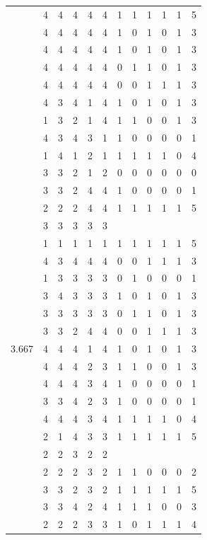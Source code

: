 \documentclass[]{msu-thesis}
\theoremstyle{definition}
\theoremstyle{definition}
\theoremstyle{definition}
\theoremstyle{remark}
\begin{document}
\begin{table}
{\begin{tabular}[t]{rrrrrrrrrrrr}
 & 4 & 4 & 4 & 4 & 4 & 1 & 1 & 1 & 1 & 1 & 5\\
 & 4 & 4 & 4 & 4 & 4 & 1 & 0 & 1 & 0 & 1 & 3\\
 & 4 & 4 & 4 & 4 & 4 & 1 & 0 & 1 & 0 & 1 & 3\\
 & 4 & 4 & 4 & 4 & 4 & 0 & 1 & 1 & 0 & 1 & 3\\
 & 4 & 4 & 4 & 4 & 4 & 0 & 0 & 1 & 1 & 1 & 3\\
 & 4 & 3 & 4 & 1 & 4 & 1 & 0 & 1 & 0 & 1 & 3\\
 & 1 & 3 & 2 & 1 & 4 & 1 & 1 & 0 & 0 & 1 & 3\\
 & 4 & 3 & 4 & 3 & 1 & 1 & 0 & 0 & 0 & 0 & 1\\
 & 1 & 4 & 1 & 2 & 1 & 1 & 1 & 1 & 1 & 0 & 4\\
 & 3 & 3 & 2 & 1 & 2 & 0 & 0 & 0 & 0 & 0 & 0\\
 & 3 & 3 & 2 & 4 & 4 & 1 & 0 & 0 & 0 & 0 & 1\\
 & 2 & 2 & 2 & 4 & 4 & 1 & 1 & 1 & 1 & 1 & 5\\
 & 3 & 3 & 3 & 3 & 3 &  &  &  &  &  & \\
 & 1 & 1 & 1 & 1 & 1 & 1 & 1 & 1 & 1 & 1 & 5\\
 & 4 & 3 & 4 & 4 & 4 & 0 & 0 & 1 & 1 & 1 & 3\\
 & 1 & 3 & 3 & 3 & 3 & 0 & 1 & 0 & 0 & 0 & 1\\
 & 3 & 4 & 3 & 3 & 3 & 1 & 0 & 1 & 0 & 1 & 3\\
 & 3 & 3 & 3 & 3 & 3 & 0 & 1 & 1 & 0 & 1 & 3\\
 & 3 & 3 & 2 & 4 & 4 & 0 & 0 & 1 & 1 & 1 & 3\\
3.667 & 4 & 4 & 4 & 1 & 4 & 1 & 0 & 1 & 0 & 1 & 3\\
 & 4 & 4 & 4 & 2 & 3 & 1 & 1 & 0 & 0 & 1 & 3\\
 & 4 & 4 & 4 & 3 & 4 & 1 & 0 & 0 & 0 & 0 & 1\\
 & 3 & 3 & 4 & 2 & 3 & 1 & 0 & 0 & 0 & 0 & 1\\
 & 4 & 4 & 4 & 3 & 4 & 1 & 1 & 1 & 1 & 0 & 4\\
 & 2 & 1 & 4 & 3 & 3 & 1 & 1 & 1 & 1 & 1 & 5\\
 & 2 & 2 & 3 & 2 & 2 &  &  &  &  &  & \\
 & 2 & 2 & 2 & 3 & 2 & 1 & 1 & 0 & 0 & 0 & 2\\
 & 3 & 3 & 2 & 3 & 2 & 1 & 1 & 1 & 1 & 1 & 5\\
 & 3 & 3 & 4 & 2 & 4 & 1 & 1 & 1 & 0 & 0 & 3\\
 & 2 & 2 & 2 & 3 & 3 & 1 & 0 & 1 & 1 & 1 & 4\\

\end{tabular}}
\end{table}
\end{document}
